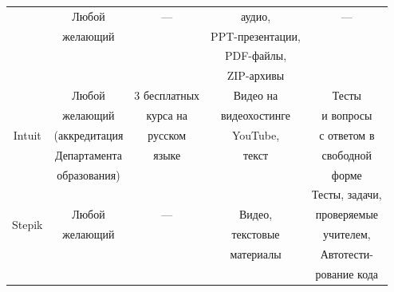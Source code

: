 \documentclass[14pt,russian]{extarticle}
\begin{document}
\begin{table}[H]
\begin{center}
\begin{tabular}{|c|c|c|c|c|}
                                            &  Любой               &                ---                  & аудио,                     &  --- \\
                                            &желающий         &                                        & PPT-презентации,& \\
                                            &                            &                                        &  PDF-файлы,          &\\
                                            &                            &                                        &  ZIP-архивы         &\\
\hline
\multirow{5}{*}{Intuit   }    &  Любой               &   3 бесплатных             & Видео на                  & Тесты\\
                                            &желающий         &       курса  на                 & видеохостинге     &  и вопросы \\
                                            &(аккредитация  &         русском                &  YouTube,              & с ответом в\\
                                            & Департамента  &       языке                      &  текст                    & свободной\\
                                            &образования)    &                                         &                               & форме\\
\hline
\multirow{4}{*}{Stepik}     &                            &                                        &                                  & Тесты, задачи,\\
                                            &  Любой               &                ---                  & Видео,                     &  проверяемые  \\
                                            &желающий         &                                        & текстовые             & учителем,\\
                                            &                            &                                        &  материалы          & Автотести-\\
                                            &                            &                                        &                                &рование кода\\
\hline
\end{tabular} 
\end{center}
\end{table}
\end{document}

